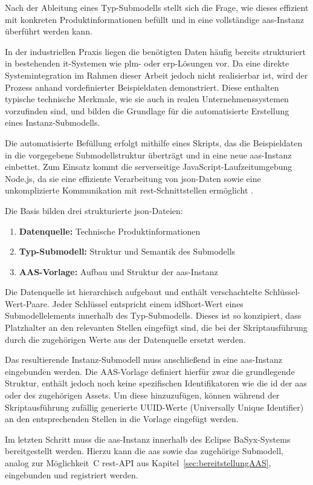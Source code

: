 Nach der Ableitung eines Typ-Submodells stellt sich die Frage, wie dieses effizient mit konkreten Produktinformationen befüllt und in eine vollständige \acs{aas}-Instanz überführt werden kann.

In der industriellen Praxis liegen die benötigten Daten häufig bereits strukturiert in bestehenden \acs{it}-Systemen wie \acs{plm}- oder \acs{erp}-Lösungen vor.
Da eine direkte Systemintegration im Rahmen dieser Arbeit jedoch nicht realisierbar ist, wird der Prozess anhand vordefinierter Beispieldaten demonstriert.
Diese enthalten typische technische Merkmale, wie sie auch in realen Unternehmenssystemen vorzufinden sind, und bilden die Grundlage für die automatisierte Erstellung eines Instanz-Submodells.

Die automatisierte Befüllung erfolgt mithilfe eines Skripts, das die Beispieldaten in die vorgegebene Submodellstruktur überträgt und in eine neue \acs{aas}-Instanz einbettet.
Zum Einsatz kommt die serverseitige JavaScript-Laufzeitumgebung Node.js, da sie eine effiziente Verarbeitung von \acs{json}-Daten sowie eine unkomplizierte Kommunikation mit \acs{rest}-Schnittstellen ermöglicht \cite{nodejs}.

Die Basis bilden drei strukturierte \acs{json}-Dateien:

\begin{enumerate}[noitemsep, leftmargin=*, label=\textbf{\arabic*.}]
    \item \textbf{Datenquelle:} Technische Produktinformationen
    \item \textbf{Typ-Submodell:} Struktur und Semantik des Submodells
    \item \textbf{AAS-Vorlage:} Aufbau und Struktur der \acs{aas}-Instanz
\end{enumerate}

Die Datenquelle ist hierarchisch aufgebaut und enthält verschachtelte Schlüssel-Wert-Paare.
Jeder Schlüssel entspricht einem idShort-Wert eines Submodellelements innerhalb des Typ-Submodells.
Dieses ist so konzipiert, dass Platzhalter an den relevanten Stellen eingefügt sind, die bei der Skriptausführung durch die zugehörigen Werte aus der Datenquelle ersetzt werden.

Das resultierende Instanz-Submodell muss anschließend in eine \acs{aas}-Instanz eingebunden werden.
Die AAS-Vorlage definiert hierfür zwar die grundlegende Struktur, enthält jedoch noch keine spezifischen Identifikatoren wie die \acs{id} der \acs{aas} oder des zugehörigen Assets.
Um diese hinzuzufügen, können während der Skriptausführung zufällig generierte UUID-Werte (Universally Unique Identifier) an den entsprechenden Stellen in die Vorlage eingefügt werden.

Im letzten Schritt muss die \acs{aas}-Instanz innerhalb des Eclipse BaSyx-Systems bereitgestellt werden.
Hierzu kann die \acs{aas} sowie das zugehörige Submodell, analog zur Möglichkeit~C \acs{rest}-API aus Kapitel~\ref{sec:bereitstellungAAS}, eingebunden und registriert werden.
